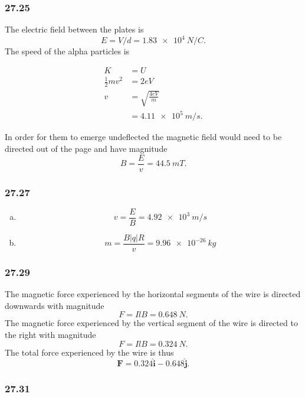 \documentclass{article}
\begin{document}
\subsubsection{27.25}

The electric field between the plates is \[E = V / d = \qty{1.83e4}{N/C}.\] The speed of the alpha particles is

\begin{align*}
  K                 & = U                      \\
  \frac{1}{2} m v^2 & = 2 e V                  \\
  v                 & = \sqrt{\frac{4 e V}{m}} \\
                    & = \qty{4.11e5}{m/s}.
\end{align*}

In order for them to emerge undeflected the magnetic field would need to be directed out of the page and have magnitude \[B = \frac{E}{v} = \qty{44.5}{mT}.\]

\subsubsection{27.27}

\begin{enumerate}[(a)]
  \item \[v = \frac{E}{B} = \qty{4.92e3}{m/s}\]

  \item \[m = \frac{B |q| R}{v} = \qty{9.96e-26}{kg}\]
\end{enumerate}

\subsubsection{27.29}

The magnetic force experienced by the horizontal segments of the wire is directed downwards with magnitude \[F = I l B = \qty{0.648}{N}.\] The magnetic force experienced by the vertical segment of the wire is directed to the right with magnitude \[F = I l B = \qty{0.324}{N}.\] The total force experienced by the wire is thus \[\mathbf{F} = 0.324 \hat{\mathbf{i}} - 0.648 \hat{\mathbf{j}}.\]

\subsubsection{27.31}
\end{document}
